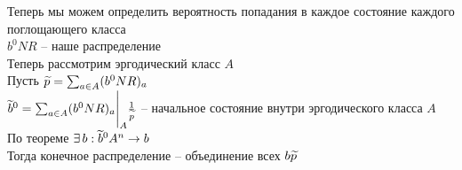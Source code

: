 \documentclass[12pt]{article}
\begin{document}
Теперь мы можем определить вероятность попадания в каждое состояние каждого поглощающего класса\\
$b^0NR$ -- наше распределение\\
Теперь рассмотрим эргодический класс $A$\\
Пусть $\widetilde p = \sum_{a\in A}(b^0 NR)_a$\\
$\widetilde b^0 = \sum_{a\in A}(b^0 NR)_a \Biggr|_A \frac1{\widetilde p}$ -- начальное состояние внутри эргодического класса $A$\\
По теореме $\exists\, b: \widetilde b^0 A^n \rightarrow b$\\
Тогда конечное распределение -- объединение всех $b\widetilde p$\\
\end{document}
